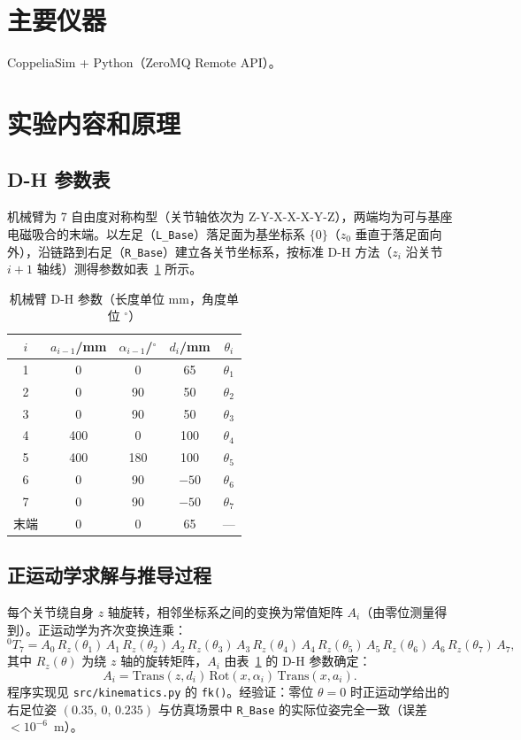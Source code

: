 \documentclass[11pt,a4paper]{ctexart}
\begin{document}
\section{主要仪器}
CoppeliaSim + Python（ZeroMQ Remote API）。

\section{实验内容和原理}

\subsection{D-H 参数表}
机械臂为 7 自由度对称构型（关节轴依次为 Z-Y-X-X-X-Y-Z），两端均为可与基座电磁吸合的末端。以左足（\texttt{L\_Base}）落足面为基坐标系 $\{0\}$（$z_0$ 垂直于落足面向外），沿链路到右足（\texttt{R\_Base}）建立各关节坐标系，按标准 D-H 方法（$z_i$ 沿关节 $i{+}1$ 轴线）测得参数如表~\ref{tab:dh} 所示。

\begin{table}[htbp]
  \centering
  \caption{机械臂 D-H 参数（长度单位 mm，角度单位 $^\circ$）}
  \label{tab:dh}
  \begin{tabular}{ccccc}
    \toprule
    $i$ & $a_{i-1}$/mm & $\alpha_{i-1}$/$^\circ$ & $d_i$/mm & $\theta_i$\\
    \midrule
    1 & 0   & 0   & 65   & $\theta_1$\\
    2 & 0   & 90  & 50   & $\theta_2$\\
    3 & 0   & 90  & 50   & $\theta_3$\\
    4 & 400 & 0   & 100  & $\theta_4$\\
    5 & 400 & 180 & 100  & $\theta_5$\\
    6 & 0   & 90  & $-50$ & $\theta_6$\\
    7 & 0   & 90  & $-50$ & $\theta_7$\\
    末端 & 0 & 0  & 65   & ---\\
    \bottomrule
  \end{tabular}
\end{table}

\subsection{正运动学求解与推导过程}
每个关节绕自身 $z$ 轴旋转，相邻坐标系之间的变换为常值矩阵 $A_i$（由零位测量得到）。正运动学为齐次变换连乘：
\begin{equation}
  {}^{0}T_{7} = A_0\,R_z(\theta_1)\,A_1\,R_z(\theta_2)\,A_2\,R_z(\theta_3)\,A_3\,R_z(\theta_4)\,A_4\,R_z(\theta_5)\,A_5\,R_z(\theta_6)\,A_6\,R_z(\theta_7)\,A_7,
\end{equation}
其中 $R_z(\theta)$ 为绕 $z$ 轴的旋转矩阵，$A_i$ 由表~\ref{tab:dh} 的 D-H 参数确定：
\begin{equation}
  A_i = \mathrm{Trans}(z, d_i)\,\mathrm{Rot}(x, \alpha_i)\,\mathrm{Trans}(x, a_i).
\end{equation}
程序实现见 \texttt{src/kinematics.py} 的 \texttt{fk()}。经验证：零位 $\theta=0$ 时正运动学给出的右足位姿 $(0.35,\,0,\,0.235)$ 与仿真场景中 \texttt{R\_Base} 的实际位姿完全一致（误差 $<10^{-6}$~m）。
\end{document}
